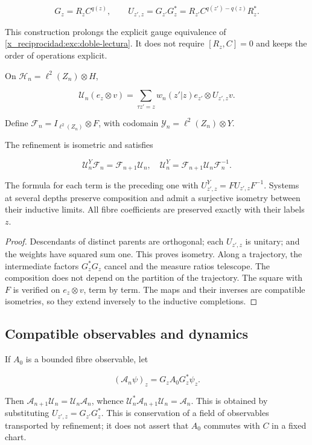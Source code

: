 \[
G_z=R_zC^{q(z)},\qquad
U_{z',z}=G_{z'}G_z^*
=R_{z'}C^{q(z')-q(z)}R_z^*.
\]

This construction prolongs the explicit gauge equivalence of \cref{x_reciprocidad:exc:doble-lectura}. It does not require \([R_z,C]=0\) and keeps the order of operations explicit.

On \(\mathscr H_n=\ell^2(Z_n)\otimes H\),

\[
\mathscr U_n(e_z\otimes v)
=\sum_{\tau z'=z}w_n(z'|z)e_{z'}\otimes U_{z',z}v.
\]

Define \(\mathscr F_n=I_{\ell^2(Z_n)}\otimes F\), with codomain \(\mathscr Y_n=\ell^2(Z_n)\otimes Y\).

\begin{theorem}
The refinement is isometric and satisfies

\[
\mathscr U^Y_n\mathscr F_n=\mathscr F_{n+1}\mathscr U_n,
\quad
\mathscr U^Y_n=\mathscr F_{n+1}\mathscr U_n\mathscr F_n^{-1}.
\]

The formula for each term is the preceding one with \(U^Y_{z',z}=FU_{z',z}F^{-1}\). Systems at several depths preserve composition and admit a surjective isometry between their inductive limits. All fibre coefficients are preserved exactly with their labels \(z\).
\end{theorem}

\begin{proof}
Descendants of distinct parents are orthogonal; each \(U_{z',z}\) is unitary; and the weights have squared sum one. This proves isometry. Along a trajectory, the intermediate factors \(G_z^*G_z\) cancel and the measure ratios telescope. The composition does not depend on the partition of the trajectory. The square with \(F\) is verified on \(e_z\otimes v\), term by term. The maps and their inverses are compatible isometries, so they extend inversely to the inductive completions.
\end{proof}

\subsection{Compatible observables and dynamics}

If \(A_0\) is a bounded fibre observable, let

\[
(\mathscr A_n\psi)_z=G_zA_0G_z^*\psi_z.
\]

Then \(\mathscr A_{n+1}\mathscr U_n=\mathscr U_n\mathscr A_n\), whence \(\mathscr U_n^*\mathscr A_{n+1}\mathscr U_n=\mathscr A_n\). This is obtained by substituting \(U_{z',z}=G_{z'}G_z^*\). This is conservation of a field of observables transported by refinement; it does not assert that \(A_0\) commutes with \(C\) in a fixed chart.

